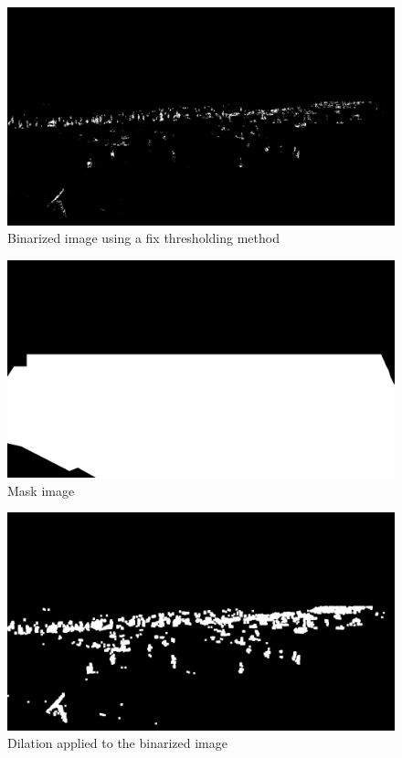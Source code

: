 \documentclass[10pt]{article}
\begin{document}
\begin{appendices}
  \begin{figure} [h]
    \centering
    \includegraphics[width=\textwidth]{img/bin_th.jpg}
    \caption{Binarized image using a fix thresholding method}
    \label{fig:binth}
  \end{figure}

  \begin{figure} [h]
    \centering
    \includegraphics[width=\textwidth]{../mask.png}
    \caption{Mask image}
    \label{fig:mask_ex}
  \end{figure}

  \begin{figure} [h]
    \centering
    \includegraphics[width=\textwidth]{img/dil.jpg}
    \caption{Dilation applied to the binarized image}
    \label{fig:dilation_ex}
  \end{figure}


\end{appendices}
\end{document}
